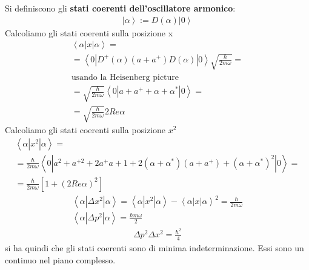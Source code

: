 Si definiscono gli \textbf{stati coerenti dell'oscillatore armonico}:
\begin{equation}\begin{split}
\left |\alpha \right\rangle:=D\left(\alpha\right)\left |0 \right\rangle
\end{split}\end{equation}
Calcoliamo gli stati coerenti sulla posizione x
\begin{equation}\begin{split}
\left\langle \alpha|x|\alpha \right\rangle=\\
= \left\langle 0|D^+\left(\alpha\right)\left(a+a^+\right)D\left(\alpha\right)|0 \right\rangle\sqrt{\frac{\hbar }{2m\omega }}=\\
\textrm{usando la Heisenberg picture}\\
= \sqrt{\frac{\hbar }{2m\omega }}\left\langle 0|a+a^++\alpha+\alpha^*|0 \right\rangle=\\
=\sqrt{\frac{\hbar }{2m\omega }}2Re{\alpha}
\end{split}\end{equation}
Calcoliamo gli stati coerenti sulla posizione $x^2$
\begin{equation}\begin{split}
\left\langle \alpha|x^2|\alpha \right\rangle=\\
=\frac{\hbar }{2m\omega }\left\langle 0|a^2+a^{+2}+2a^+a+1+2\left(\alpha+\alpha^*\right)\left(a+a^+\right)+\left(\alpha+\alpha^*\right)^2|0 \right\rangle =\\
=\frac{\hbar }{2m\omega }\left[1+\left(2Re\alpha\right)^2\right]
\end{split}\end{equation}
\begin{equation}\begin{split}
\left\langle \alpha|\Delta x^2|\alpha \right\rangle=\left\langle \alpha|x^2|\alpha \right\rangle-\left\langle \alpha|x|\alpha \right\rangle^2=\frac{\hbar }{2m\omega }\\
\left\langle \alpha|\Delta p^2|\alpha \right\rangle=\frac{\hbar m\omega }{2}
\end{split}\end{equation}
\begin{equation}\begin{split}
\Delta p^2\Delta x^2=\frac{\hbar ^2}{4}
\end{split}\end{equation}
si ha quindi che gli stati coerenti sono di minima indeterminazione. Essi sono un continuo nel piano complesso.

